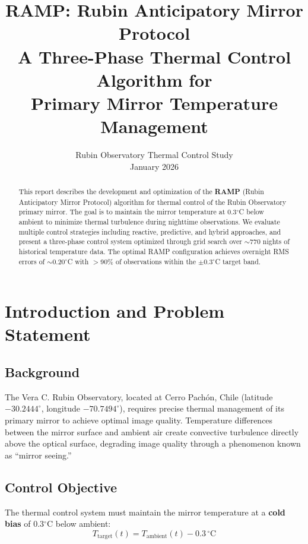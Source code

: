 \documentclass[11pt,letterpaper]{article}
\title{\textbf{RAMP: Rubin Anticipatory Mirror Protocol}\\[0.5em]
\Large A Three-Phase Thermal Control Algorithm for\\Primary Mirror Temperature Management}
\author{Rubin Observatory Thermal Control Study\\[0.5em]
\small January 2026}
\date{}
\begin{document}
\maketitle

\begin{abstract}
This report describes the development and optimization of the \textbf{RAMP} (Rubin Anticipatory Mirror Protocol) algorithm for thermal control of the Rubin Observatory primary mirror. The goal is to maintain the mirror temperature at 0.3$^\circ$C below ambient to minimize thermal turbulence during nighttime observations. We evaluate multiple control strategies including reactive, predictive, and hybrid approaches, and present a three-phase control system optimized through grid search over $\sim$770 nights of historical temperature data. The optimal RAMP configuration achieves overnight RMS errors of $\sim$0.20$^\circ$C with $>$90\% of observations within the $\pm$0.3$^\circ$C target band.
\end{abstract}

\tableofcontents
\newpage

\section{Introduction and Problem Statement}

\subsection{Background}

The Vera C. Rubin Observatory, located at Cerro Pach\'{o}n, Chile (latitude $-30.2444^\circ$, longitude $-70.7494^\circ$), requires precise thermal management of its primary mirror to achieve optimal image quality. Temperature differences between the mirror surface and ambient air create convective turbulence directly above the optical surface, degrading image quality through a phenomenon known as ``mirror seeing.''

\subsection{Control Objective}

The thermal control system must maintain the mirror temperature at a \textbf{cold bias} of 0.3$^\circ$C below ambient:
\begin{equation}
T_{\text{target}}(t) = T_{\text{ambient}}(t) - 0.3\,^\circ\text{C}
\label{eq:target}
\end{equation}
\end{document}
